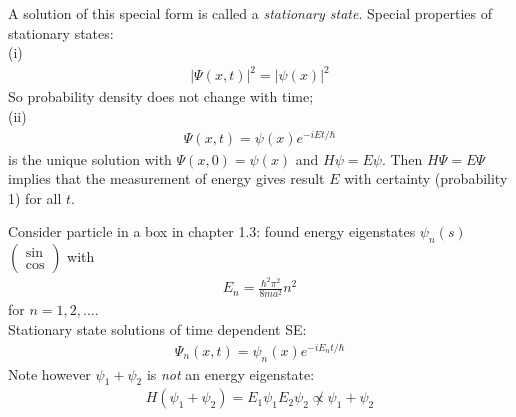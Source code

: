 \documentclass[a4paper]{article}
\begin{document}
A solution of this special form is called a \emph{stationary state}. Special properties of stationary states:\\
(i)
\begin{equation*}
\begin{aligned}
\left|\Psi \left(x,t\right)\right|^2 = \left|\psi\left(x\right)\right|^2
\end{aligned}
\end{equation*}
So probability density does not change with time;\\
(ii)
\begin{equation*}
\begin{aligned}
\Psi\left(x,t\right) = \psi\left(x\right) e^{-iEt/\hbar}
\end{aligned}
\end{equation*}
is the unique solution with $\Psi\left(x,0\right) = \psi\left(x\right)$ and $H\psi = E\psi$. Then $H\Psi = E\Psi$ implies that the measurement of energy gives result $E$ with certainty (probability 1) for all $t$.

\begin{eg}
Consider particle in a box in chapter 1.3: found energy eigenstates $\psi_n\left(s\right)$ $\left(\begin{array}{ll}\sin \\ \cos\end{array}\right)$ with
\begin{equation*}
\begin{aligned}
E_n = \frac{\hbar^2 \pi^2}{8ma^2} n^2
\end{aligned}
\end{equation*}
for $n=1,2,...$.\\
Stationary state solutions of time dependent SE:
\begin{equation*}
\begin{aligned}
\Psi_n\left(x,t\right) = \psi_n\left(x\right) e^{-iE_n t/\hbar}
\end{aligned}
\end{equation*}
Note however $\psi_1+\psi_2$ is \emph{not} an energy eigenstate:
\begin{equation*}
\begin{aligned}
H\left(\psi_1+\psi_2\right) = E_1\psi_1 E_2 \psi_2 \not\propto \psi_1+\psi_2
\end{aligned}
\end{equation*}
\end{eg}
\end{document}

